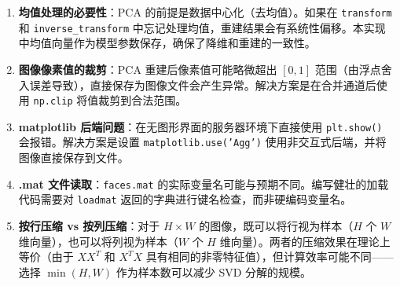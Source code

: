 \documentclass[a4paper]{article}
\begin{document}
\begin{enumerate}
    \item \textbf{均值处理的必要性}：PCA 的前提是数据中心化（去均值）。如果在 \texttt{transform} 和 \texttt{inverse\_transform} 中忘记处理均值，重建结果会有系统性偏移。本实现中均值向量作为模型参数保存，确保了降维和重建的一致性。

    \item \textbf{图像像素值的裁剪}：PCA 重建后像素值可能略微超出 $[0, 1]$ 范围（由浮点舍入误差导致），直接保存为图像文件会产生异常。解决方案是在合并通道后使用 \texttt{np.clip} 将值裁剪到合法范围。

    \item \textbf{matplotlib 后端问题}：在无图形界面的服务器环境下直接使用 \texttt{plt.show()} 会报错。解决方案是设置 \texttt{matplotlib.use('Agg')} 使用非交互式后端，并将图像直接保存到文件。

    \item \textbf{.mat 文件读取}：\texttt{faces.mat} 的实际变量名可能与预期不同。编写健壮的加载代码需要对 \texttt{loadmat} 返回的字典进行键名检查，而非硬编码变量名。

    \item \textbf{按行压缩 vs 按列压缩}：对于 $H \times W$ 的图像，既可以将行视为样本（$H$ 个 $W$ 维向量），也可以将列视为样本（$W$ 个 $H$ 维向量）。两者的压缩效果在理论上等价（由于 $XX^T$ 和 $X^TX$ 具有相同的非零特征值），但计算效率可能不同——选择 $\min(H, W)$ 作为样本数可以减少 SVD 分解的规模。
\end{enumerate}
\end{document}
